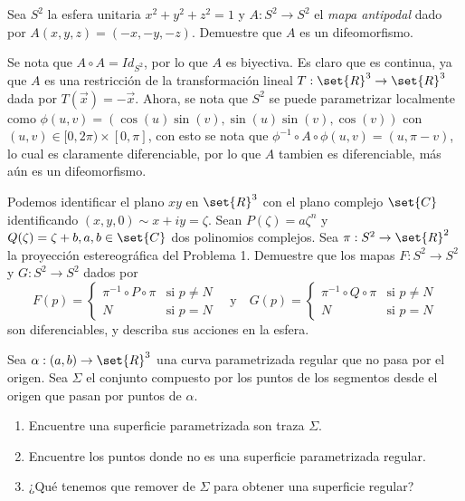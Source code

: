 \documentclass{homework}
\begin{document}
\begin{prob}
    Sea \(S^2\) la esfera unitaria \(x^2+y^2+z^2=1\) y \(A:S^2\rightarrow S^2\) el \textit{mapa antipodal} dado por \(A(x,y,z)=(-x,-y,-z)\). Demuestre que \(A\) es un difeomorfismo.
\end{prob}

\begin{sol}
    Se nota que \(A\circ A=Id_{S^2}\), por lo que \(A\) es biyectiva. Es claro que es continua, ya que \(A\) es una restricción de la transformación lineal \(T:\set{R}^3\rightarrow\set{R}^3\) dada por \(T(\vec{x})=-\vec{x}\). Ahora, se nota que \(S^2\) se puede parametrizar localmente como \(\phi(u,v)=(\cos(u)\sin(v),\sin(u)\sin(v),\cos(v))\) con \((u,v)\in[0,2\pi)\times[0,\pi]\), con esto se nota que \(\phi^{-1}\circ A\circ\phi(u,v)=(u,\pi-v)\), lo cual es claramente diferenciable, por lo que \(A\) tambien es diferenciable, más aún es un difeomorfismo.
\end{sol}


\begin{prob}
    Podemos identificar el plano \(xy\) en \(\set{R}^3\) con el plano complejo \(\set{C}\) identificando \((x,y,0)\sim x+iy=\zeta\). Sean \(P(\zeta)=a\zeta^n\) y \(Q(\zeta)=\zeta+b,a,b\in\set{C}\) dos polinomios complejos. Sea \(\pi:S^2\rightarrow\set{R}^2\) la proyección estereográfica del Problema 1. Demuestre que los mapas \(F:S^2\rightarrow S^2\) y \(G:S^2\rightarrow S^2\) dados por
    \begin{equation*}
        F(p)=\begin{cases}
            \pi^{-1}\circ P\circ \pi &\text{si }p\neq N\\
            N &\text{si }p=N
        \end{cases}\quad\text{y}\quad G(p)=\begin{cases}
            \pi^{-1}\circ Q\circ \pi &\text{si }p\neq N\\
            N &\text{si }p=N
        \end{cases}
    \end{equation*}
    son diferenciables, y describa sus acciones en la esfera.
\end{prob}

\begin{sol}

\end{sol}


\begin{prob}
    Sea \(\alpha:(a,b)\rightarrow\set{R}^3\) una curva parametrizada regular que no pasa por el origen. Sea \(\Sigma\) el conjunto compuesto por los puntos de los segmentos desde el origen que pasan por puntos de \(\alpha\).
    \begin{enumerate}
        \item Encuentre una superficie parametrizada son traza \(\Sigma\).
        \item Encuentre los puntos donde no es una superficie parametrizada regular.
        \item ¿Qué tenemos que remover de \(\Sigma\) para obtener una superficie regular?
    \end{enumerate}
\end{prob}
\end{document}
